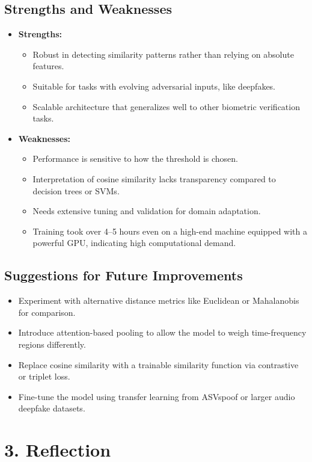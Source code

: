 \documentclass{article}
\begin{document}
\subsection*{Strengths and Weaknesses}
\begin{itemize}
\item \textbf{Strengths:}
\begin{itemize}
\item Robust in detecting similarity patterns rather than relying on absolute features.
\item Suitable for tasks with evolving adversarial inputs, like deepfakes.
\item Scalable architecture that generalizes well to other biometric verification tasks.
\end{itemize}
\item \textbf{Weaknesses:}
\begin{itemize}
\item Performance is sensitive to how the threshold is chosen.
\item Interpretation of cosine similarity lacks transparency compared to decision trees or SVMs.
\item Needs extensive tuning and validation for domain adaptation.
\item Training took over 4–5 hours even on a high-end machine equipped with a powerful GPU, indicating high computational demand.
\end{itemize}
\end{itemize}

\subsection*{Suggestions for Future Improvements}
\begin{itemize}
\item Experiment with alternative distance metrics like Euclidean or Mahalanobis for comparison.
\item Introduce attention-based pooling to allow the model to weigh time-frequency regions differently.
\item Replace cosine similarity with a trainable similarity function via contrastive or triplet loss.
\item Fine-tune the model using transfer learning from ASVspoof or larger audio deepfake datasets.
\end{itemize}

\section*{3. Reflection}
\end{document}
